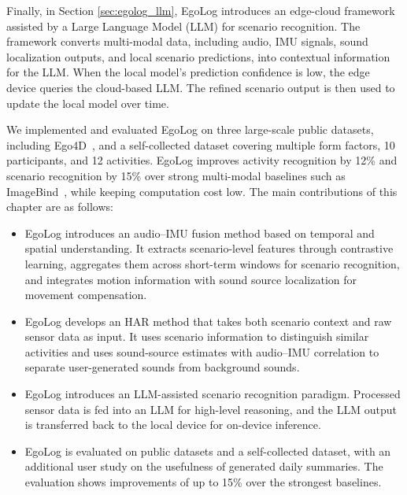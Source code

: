 Finally, in Section \ref{sec:egolog_llm}, EgoLog introduces an edge-cloud framework assisted by a Large Language Model (LLM) for scenario recognition. The framework converts multi-modal data, including audio, IMU signals, sound localization outputs, and local scenario predictions, into contextual information for the LLM.
When the local model's prediction confidence is low, the edge device queries the cloud-based LLM. The refined scenario output is then used to update the local model over time.


We implemented and evaluated EgoLog on three large-scale public datasets, including Ego4D~\citep{grauman2022ego4d}, and a self-collected dataset covering multiple form factors, 10 participants, and 12 activities.
EgoLog improves activity recognition by 12\% and scenario recognition by 15\% over strong multi-modal baselines such as ImageBind~\citep{girdhar2023imagebind}, while keeping computation cost low.
The main contributions of this chapter are as follows:


\begin{itemize}
    \item
    EgoLog introduces an audio--IMU fusion method based on temporal and spatial understanding. It extracts scenario-level features through contrastive learning, aggregates them across short-term windows for scenario recognition, and integrates motion information with sound source localization for movement compensation.

    \item
    EgoLog develops an HAR method that takes both scenario context and raw sensor data as input. It uses scenario information to distinguish similar activities and uses sound-source estimates with audio--IMU correlation to separate user-generated sounds from background sounds.

    \item
    EgoLog introduces an LLM-assisted scenario recognition paradigm. Processed sensor data is fed into an LLM for high-level reasoning, and the LLM output is transferred back to the local device for on-device inference.

    \item
    EgoLog is evaluated on public datasets and a self-collected dataset, with an additional user study on the usefulness of generated daily summaries. The evaluation shows improvements of up to 15\% over the strongest baselines.
\end{itemize}
